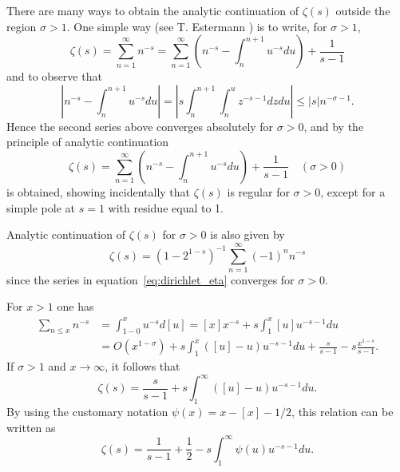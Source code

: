 \documentclass[11pt]{article}
\begin{document}
There are many ways to obtain the analytic continuation of $\zeta(s)$ outside the region $\sigma > 1$. One simple way (see T. Estermann \cite{Est2}) is to write, for $\sigma > 1$,
\begin{equation}\label{eq:estermann}
\zeta(s) = \sum_{n=1}^{\infty} n^{-s} = \sum_{n=1}^{\infty} \left( n^{-s} - \int_n^{n+1} u^{-s} du \right) + \frac{1}{s-1}
\end{equation}
and to observe that
\begin{equation}\label{eq:estermann_bound}
\left| n^{-s} - \int_n^{n+1} u^{-s} du \right| = \left| s \int_n^{n+1} \int_n^u z^{-s-1} dz du \right| \leq |s| n^{-\sigma-1}.
\end{equation}
Hence the second series above converges absolutely for $\sigma > 0$, and by the principle of analytic continuation
\begin{equation}\label{eq:analytic_cont}
\zeta(s) = \sum_{n=1}^{\infty} \left( n^{-s} - \int_n^{n+1} u^{-s} du \right) + \frac{1}{s-1} \quad (\sigma > 0)
\end{equation}
is obtained, showing incidentally that $\zeta(s)$ is regular for $\sigma > 0$, except for a simple pole at $s = 1$ with residue equal to 1.

Analytic continuation of $\zeta(s)$ for $\sigma > 0$ is also given by
\begin{equation}\label{eq:dirichlet_eta}
\zeta(s) = (1 - 2^{1-s})^{-1} \sum_{n=1}^{\infty} (-1)^n n^{-s}
\end{equation}
since the series in equation~\eqref{eq:dirichlet_eta} converges for $\sigma > 0$.

For $x > 1$ one has
\begin{align}\label{eq:partial_sum}
\sum_{n \leq x} n^{-s} &= \int_{1-0}^x u^{-s} d[u] = [x] x^{-s} + s \int_1^x [u] u^{-s-1} du \\
&= O(x^{1-\sigma}) + s \int_1^x ([u] - u) u^{-s-1} du + \frac{s}{s-1} - s \frac{x^{1-s}}{s-1}. \nonumber
\end{align}
If $\sigma > 1$ and $x \to \infty$, it follows that
\begin{equation}\label{eq:integral_form}
\zeta(s) = \frac{s}{s-1} + s \int_1^{\infty} ([u] - u) u^{-s-1} du.
\end{equation}
By using the customary notation $\psi(x) = x - [x] - 1/2$, this relation can be written as
\begin{equation}\label{eq:psi_integral}
\zeta(s) = \frac{1}{s-1} + \frac{1}{2} - s \int_1^{\infty} \psi(u) u^{-s-1} du.
\end{equation}
\end{document}
